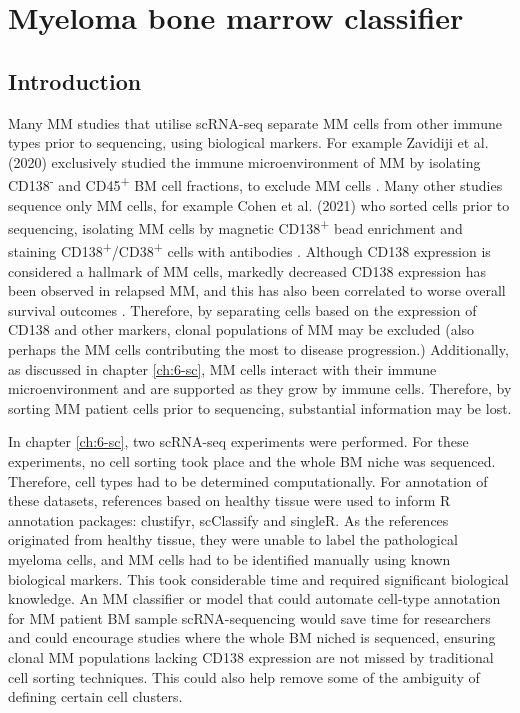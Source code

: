 \section{Myeloma bone marrow classifier}\label{sec:MM_classifier}
\subsection{Introduction}

Many MM studies that utilise scRNA-seq separate MM cells from other immune types prior to sequencing, using biological markers.
For example Zavidiji et al. (2020) exclusively studied the immune microenvironment of MM by isolating CD138\textsuperscript{-} and CD45\textsuperscript{+} BM cell fractions, to exclude MM cells \cite{zavidij2020single}.
Many other studies sequence only MM cells, for example Cohen et al. (2021) who sorted cells prior to sequencing, isolating MM cells by magnetic CD138\textsuperscript{+} bead enrichment and staining CD138\textsuperscript{+}/CD38\textsuperscript{+} cells with antibodies \cite{cohen2021identification}.
Although CD138 expression is considered a hallmark of MM cells, markedly decreased CD138 expression has been observed in relapsed MM, and this has also been correlated to worse overall survival outcomes \cite{kawano2012multiple}.
Therefore, by separating cells based on the expression of CD138 and other markers, clonal populations of MM may be excluded (also perhaps the MM cells contributing the most to disease progression.)
Additionally, as discussed in chapter \ref{ch:6-sc}, MM cells interact with their immune microenvironment and are supported as they grow by immune cells.
Therefore, by sorting MM patient cells prior to sequencing, substantial information may be lost.

In chapter \ref{ch:6-sc}, two scRNA-seq experiments were performed.
For these experiments, no cell sorting took place and the whole BM niche was sequenced.
Therefore, cell types had to be determined computationally.
For annotation of these datasets, references based on healthy tissue were used to inform R annotation packages: clustifyr, scClassify and singleR.
As the references originated from healthy tissue, they were unable to label the pathological myeloma cells, and MM cells had to be identified manually using known biological markers.
This took considerable time and required significant biological knowledge.
An MM classifier or model that could automate cell-type annotation for MM patient BM sample scRNA-sequencing would save time for researchers and could encourage studies where the whole BM niched is sequenced, ensuring clonal MM populations lacking CD138 expression are not missed by traditional cell sorting techniques.
This could also help remove some of the ambiguity of defining certain cell clusters.

